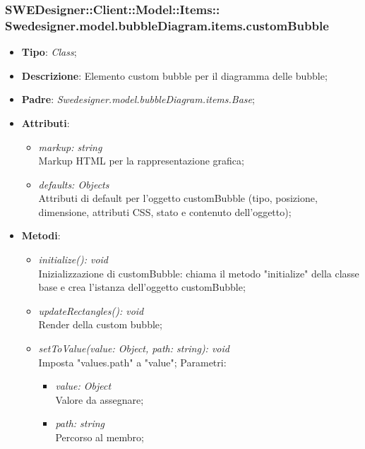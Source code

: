 \documentclass[../DefinizioneDiProdotto.tex]{subfiles}
\begin{document}
			\subsubsection[Swedesigner.model.bubbleDiagram.items.customBubble]{SWEDesigner::Client::Model::Items::\\Swedesigner.model.bubbleDiagram.items.customBubble}
			\hypertarget{SWEDesigner::Client::Model::Items::Swedesigner.model.bubbleDiagram.items.customBubble}{}
			\begin{itemize}
				\item \textbf{Tipo}: \emph{Class};
				\item \textbf{Descrizione}: Elemento custom bubble per il diagramma delle bubble;
				\item \textbf{Padre}: \emph{Swedesigner.model.bubbleDiagram.items.Base};
				\item \textbf{Attributi}:
				\begin{itemize}
					\item \emph{markup: string}\\
					Markup HTML per la rappresentazione grafica;
					\item \emph{defaults: Objects}\\
					Attributi di default per l'oggetto customBubble (tipo, posizione, dimensione, attributi CSS, stato e contenuto dell'oggetto);
				\end{itemize}
				\item \textbf{Metodi}:
				\begin{itemize}
					\item \emph{initialize(): void}\\
					Inizializzazione di customBubble: chiama il metodo "initialize" della classe base e crea l'istanza dell'oggetto customBubble;
					\item \emph{updateRectangles(): void}\\
					Render della custom bubble;
					\item \emph{setToValue(value: Object, path: string): void}\\
					Imposta "values.path" a "value";
					Parametri:
					\begin{itemize}
						\item \emph{value: Object} \\
						Valore da assegnare;
						\item \emph{path: string} \\
						Percorso al membro;
					\end{itemize}
				\end{itemize}
			\end{itemize}
			
\end{document}
